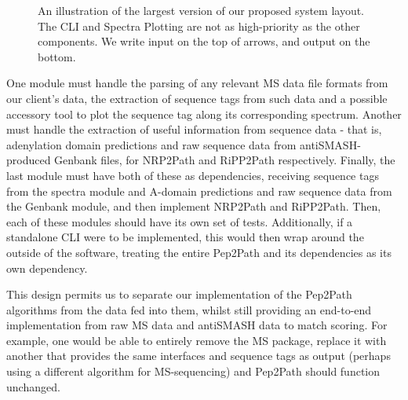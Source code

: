 \documentclass{l4proj}
\begin{document}
\begin{figure}
    \centering

    \caption{An illustration of the largest version of our proposed system layout. The CLI and Spectra Plotting are not as high-priority as the other
    components. We write input on the top of arrows, and output on the bottom.
    }

    \label{fig:system_layout}
\end{figure}

One module must handle the parsing of any relevant MS data file formats from our client's data, the extraction of sequence tags from such data and a possible accessory tool to plot the sequence tag along its corresponding spectrum. Another must handle the extraction of useful information from sequence data - that is, adenylation domain predictions and raw sequence data from antiSMASH-produced Genbank files, for NRP2Path and RiPP2Path respectively. Finally, the last module must have both of these as dependencies, receiving sequence tags from the spectra module and A-domain predictions and raw sequence data from the Genbank module, and then implement NRP2Path and RiPP2Path. Then, each of these modules should have its own set of tests. Additionally, if a standalone CLI were to be implemented, this would then wrap around the outside of the software, treating the entire Pep2Path and its dependencies as its own dependency.

This design permits us to separate our implementation of the Pep2Path algorithms from the data fed into them, whilst still providing an end-to-end implementation from raw MS data and antiSMASH data to match scoring. For example, one would be able to entirely remove the MS package, replace it with another that provides the same interfaces and sequence tags as output (perhaps using a different algorithm for MS-sequencing) and Pep2Path should function unchanged.
\end{document}
